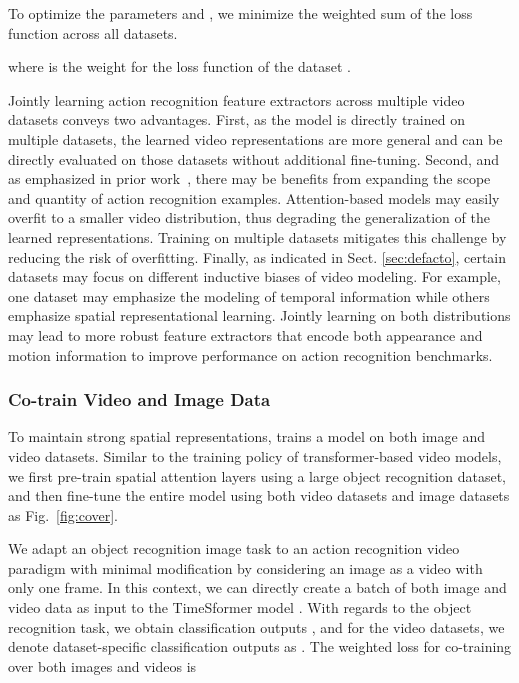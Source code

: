 To optimize the parameters  and , we minimize the weighted sum of the loss function across all  datasets.

where  is the weight for the loss function of the dataset .

Jointly learning action recognition feature extractors across multiple video datasets conveys two advantages. First, as the model is directly trained on multiple datasets, the learned video representations are more general and can be directly evaluated on those datasets without additional fine-tuning. Second, and as emphasized in prior work~\cite{bertasius2021space}, there may be benefits from expanding the scope and quantity of action recognition examples. Attention-based models may easily overfit to a smaller video distribution, thus degrading the generalization of the learned representations. Training on multiple datasets mitigates this challenge by reducing the risk of overfitting. Finally, as indicated in Sect. \ref{sec:defacto}, certain datasets may focus on different inductive biases of video modeling. For example, one dataset may emphasize the modeling of temporal information while others emphasize spatial representational learning. Jointly learning on both distributions may lead to more robust feature extractors that encode both appearance and motion information to improve performance on action recognition benchmarks. 



\subsubsection{Co-train Video and Image Data}

To maintain strong spatial representations, \ourmethod trains a model  on both image and video datasets. Similar to the training policy of transformer-based video models, we first pre-train spatial attention layers  using a large object recognition dataset, and then fine-tune the entire model  using both video datasets  and image datasets  as Fig.~\ref{fig:cover}.  


We adapt an object recognition image task to an action recognition video paradigm with minimal modification by considering an image as a video with only one frame. In this context, we can directly create a batch of both image  and video  data as input to the TimeSformer model . With regards to the object recognition task, we obtain classification outputs , and for the video datasets, we denote dataset-specific classification outputs as . The weighted loss for co-training over both images and videos is 



